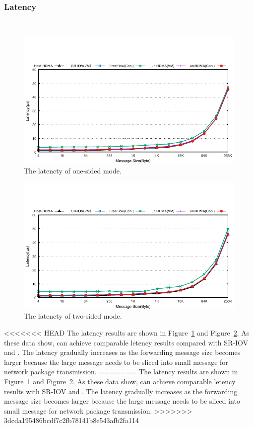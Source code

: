 \subsubsection{\textbf{Latency}}
\
\noindent

\begin{figure}[!ht]
	\centering
	\includegraphics[width=1.00\linewidth]{images/write-lat.pdf}
	\caption{The latencty of one-sided mode.}
	\label{fig:write-lat}
\end{figure}


\begin{figure}[!ht]
	\centering
	\includegraphics[width=1.00\linewidth]{images/send-lat.pdf}
	\caption{The latencty of two-sided mode.}
	\label{fig:send-lat}
\end{figure}

<<<<<<< HEAD
The latency results are shown in Figure~\ref{fig:write-lat} and Figure~\ref{fig:send-lat}. As these data show, \sys can achieve comparable letency results compared with SR-IOV and \native. The latency gradually increases as the forwarding message size becomes larger because the large message needs to be sliced into small message for network package transmission.
=======
The latency results are shown in Figure~\ref{fig:write-lat} and Figure~\ref{fig:send-lat}. As these data show, \sys can achieve comparable letency results with SR-IOV and \native. The latency gradually increases as the forwarding message size becomes larger because the large message needs to be sliced into small message for network package transmission.
>>>>>>> 3dcda195486bcdf7c2fb78141b8e543afb2fa114

